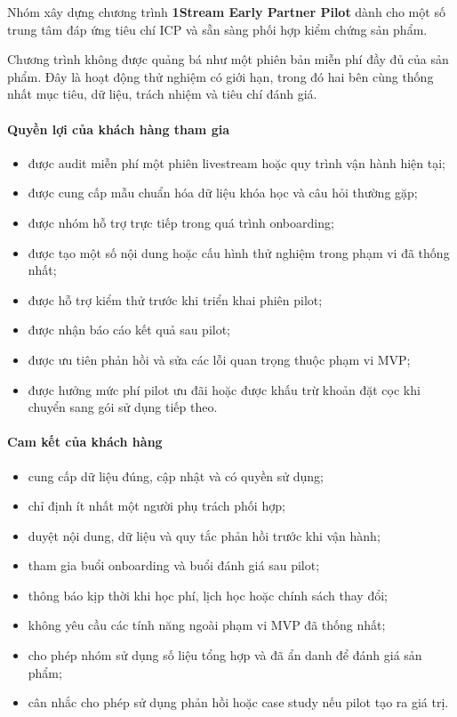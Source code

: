 Nhóm xây dựng chương trình \textbf{1Stream Early Partner Pilot} dành cho một số trung tâm đáp ứng tiêu chí ICP và sẵn sàng phối hợp kiểm chứng sản phẩm.

Chương trình không được quảng bá như một phiên bản miễn phí đầy đủ của sản phẩm. Đây là hoạt động thử nghiệm có giới hạn, trong đó hai bên cùng thống nhất mục tiêu, dữ liệu, trách nhiệm và tiêu chí đánh giá.

\paragraph{Quyền lợi của khách hàng tham gia}

\begin{itemize}
    \item được audit miễn phí một phiên livestream hoặc quy trình vận hành hiện tại;
    \item được cung cấp mẫu chuẩn hóa dữ liệu khóa học và câu hỏi thường gặp;
    \item được nhóm hỗ trợ trực tiếp trong quá trình onboarding;
    \item được tạo một số nội dung hoặc cấu hình thử nghiệm trong phạm vi đã thống nhất;
    \item được hỗ trợ kiểm thử trước khi triển khai phiên pilot;
    \item được nhận báo cáo kết quả sau pilot;
    \item được ưu tiên phản hồi và sửa các lỗi quan trọng thuộc phạm vi MVP;
    \item được hưởng mức phí pilot ưu đãi hoặc được khấu trừ khoản đặt cọc khi chuyển sang gói sử dụng tiếp theo.
\end{itemize}

\paragraph{Cam kết của khách hàng}

\begin{itemize}
    \item cung cấp dữ liệu đúng, cập nhật và có quyền sử dụng;
    \item chỉ định ít nhất một người phụ trách phối hợp;
    \item duyệt nội dung, dữ liệu và quy tắc phản hồi trước khi vận hành;
    \item tham gia buổi onboarding và buổi đánh giá sau pilot;
    \item thông báo kịp thời khi học phí, lịch học hoặc chính sách thay đổi;
    \item không yêu cầu các tính năng ngoài phạm vi MVP đã thống nhất;
    \item cho phép nhóm sử dụng số liệu tổng hợp và đã ẩn danh để đánh giá sản phẩm;
    \item cân nhắc cho phép sử dụng phản hồi hoặc case study nếu pilot tạo ra giá trị.
\end{itemize}

